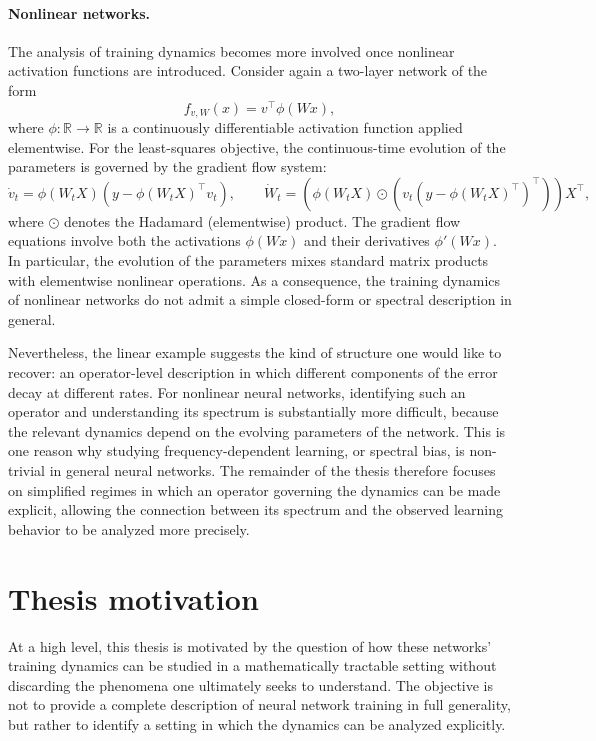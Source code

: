 \paragraph{Nonlinear networks.}
The analysis of training dynamics becomes more involved once nonlinear
activation functions are introduced. Consider again a two-layer network of the form
\[
	f_{v,W}(x) = v^\top \phi(Wx),
\]
where $\phi:\mathbb{R}\to\mathbb{R}$ is a continuously differentiable activation
function applied elementwise. For the least-squares objective, the continuous-time evolution of the parameters is governed by the gradient flow system:
\begin{equation}
	\dot v_t = \phi(W_tX)(y - \phi(W_tX)^\top v_t),
	\qquad
	\dot W_t = \left( \phi(W_tX) \odot \left( v_t (y - \phi(W_tX)^\top)^\top \right) \right)X^\top,
\end{equation}
where $\odot$ denotes the Hadamard (elementwise) product.
The gradient flow equations involve both the activations $\phi(Wx)$
and their derivatives $\phi'(Wx)$. In particular, the evolution of the
parameters mixes standard matrix products with elementwise nonlinear
operations. As a consequence, the training dynamics of nonlinear networks do not admit a
simple closed-form or spectral description in general.

Nevertheless, the linear example suggests the kind of structure one would like
to recover: an operator-level description in which different components of the
error decay at different rates. For nonlinear neural networks, identifying such
an operator and understanding its spectrum is substantially more difficult,
because the relevant dynamics depend on the evolving parameters of the network.
This is one reason why studying frequency-dependent learning, or spectral bias,
is non-trivial in general neural networks. The remainder of the thesis therefore
focuses on simplified regimes in which an operator governing the dynamics can be
made explicit, allowing the connection between its spectrum and the observed
learning behavior to be analyzed more precisely.

\section{Thesis motivation}
At a high level, this thesis is motivated by the question of how these networks'
training dynamics can be studied in a mathematically tractable setting without
discarding the phenomena one ultimately seeks to understand. The objective is
not to provide a complete description of neural network training in full
generality, but rather to identify a setting in which the dynamics can be
analyzed explicitly.

